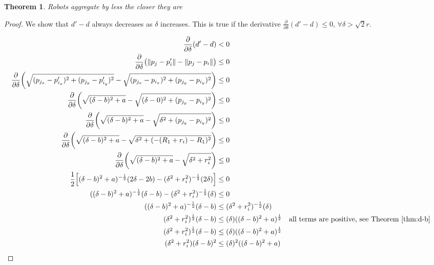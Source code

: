 \documentclass[conference]{IEEEtran}
\newtheorem{theorem}{Theorem}
\begin{document}
  \begin{theorem} \label{thm:d-d}
    Robots aggregate by less the closer they are
  \end{theorem}
  \begin{proof}

    We show that $d'-d$ always decreases as $\delta$ increases. This is true if the derivative $\frac{\partial}{\partial\delta}(d'-d) \leq 0$, $\forall \delta>\sqrt{2}r$.

    {%
      \setlength{\belowdisplayskip}{3pt}%
      \setlength{\abovedisplayskip}{3pt}%
      \begin{align*}
        \frac{\partial}{\partial\delta}(d'-d) &< 0 \\
        \frac{\partial}{\partial\delta}\big(\lVert p_j - p'_i \rVert - \lVert p_j - p_i \rVert\big) &\leq 0 \\
        \frac{\partial}{\partial\delta}\bigg(\sqrt{(p_{j_x} - p'_{i_x})^2 + (p_{j_y} - p'_{i_y})^2} - \sqrt{(p_{j_x} - p_{i_x})^2 + (p_{j_y} - p_{i_y})^2}\bigg) &\leq 0 \\
        \frac{\partial}{\partial\delta}\bigg(\sqrt{(\delta - b)^2 + a} - \sqrt{(\delta- 0)^2 + (p_{j_y} - p_{i_y})^2}\bigg) &\leq 0 \\
        \frac{\partial}{\partial\delta}\bigg(\sqrt{(\delta - b)^2 + a} - \sqrt{\delta^2 + (p_{j_y} - p_{i_y})^2}\bigg) &\leq 0 \\
        \frac{\partial}{\partial\delta}\bigg(\sqrt{(\delta-b)^2 + a} - \sqrt{\delta^2 + (-(R_1+r_i) - R_1)^2}\bigg) &\leq 0 \\
        \frac{\partial}{\partial\delta}\bigg(\sqrt{(\delta-b)^2 + a} - \sqrt{\delta^2 + r_i^2}\bigg) &\leq 0 \\
        \frac{1}{2}\Big[(\delta-b)^2 + a)^{-\frac{1}{2}}(2\delta-2b) - (\delta^2 + r_i^2)^{-\frac{1}{2}}(2\delta)\Big] &\leq 0 \\
        ((\delta-b)^2 + a)^{-\frac{1}{2}}(\delta-b) - (\delta^2 + r_i^2)^{-\frac{1}{2}}(\delta) &\leq 0 \\
        ((\delta-b)^2 + a)^{-\frac{1}{2}}(\delta-b) &\leq (\delta^2 + r_i^2)^{-\frac{1}{2}}(\delta) \\
        (\delta^2 + r_i^2)^{\frac{1}{2}}(\delta-b) &\leq (\delta)((\delta-b)^2 + a)^{\frac{1}{2}} && \text{all terms are positive, see Theorem \ref{thm:d-b}} \\
        (\delta^2 + r_i^2)^{\frac{1}{2}}(\delta-b) &\leq (\delta)((\delta-b)^2 + a)^{\frac{1}{2}} \\
        (\delta^2 + r_i^2)(\delta-b)^2 &\leq (\delta)^2((\delta-b)^2 + a) \\

\end{align*}}
\end{proof}
\end{document}
